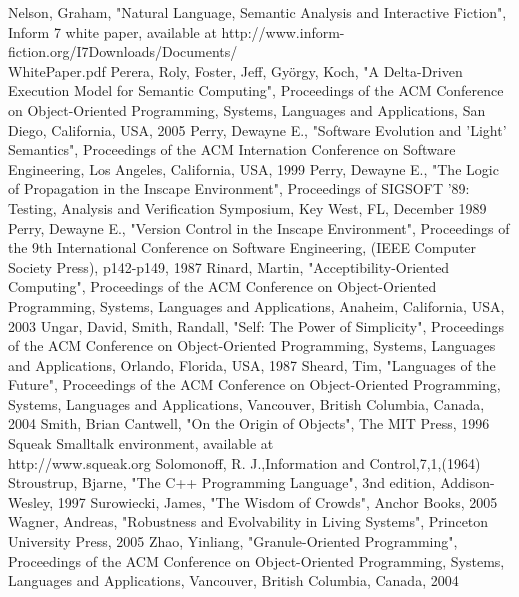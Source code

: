 \documentclass[10pt]{sigplanconf}
\begin{document}
\begin{thebibliography}{}
Nelson, Graham, "Natural Language, Semantic Analysis and Interactive Fiction", Inform 7 white paper, available at http://www.inform-fiction.org/I7Downloads/Documents/ \\
WhitePaper.pdf
Perera, Roly, Foster, Jeff, Gy\"orgy, Koch, "A Delta-Driven Execution Model for Semantic Computing", Proceedings of the ACM Conference on Object-Oriented Programming, Systems, Languages and Applications, San Diego, California, USA, 2005
Perry, Dewayne E., "Software Evolution and 'Light' Semantics", Proceedings of the ACM Internation Conference on Software Engineering, Los Angeles,  California, USA, 1999
Perry, Dewayne E., "The Logic of Propagation in the Inscape Environment", Proceedings of SIGSOFT '89: Testing, Analysis and Verification Symposium, Key West, FL, December 1989
Perry, Dewayne E., "Version Control in the Inscape Environment", Proceedings of the 9th International Conference on Software Engineering,
(IEEE Computer Society Press), p142-p149, 1987
Rinard, Martin, "Acceptibility-Oriented Computing", Proceedings of the ACM Conference on Object-Oriented Programming, Systems, Languages and Applications, Anaheim, California, USA, 2003
Ungar, David, Smith, Randall, "Self: The Power of Simplicity", Proceedings of the ACM Conference on Object-Oriented Programming, Systems, Languages and Applications,  Orlando, Florida, USA, 1987
Sheard,  Tim, "Languages of the Future", Proceedings of the ACM Conference on Object-Oriented Programming, Systems, Languages and Applications,  Vancouver, British Columbia, Canada, 2004
Smith, Brian Cantwell, "On the Origin of Objects", The MIT Press, 1996
Squeak Smalltalk environment, available at \\
http://www.squeak.org
Solomonoff, R. J.,Information and Control,7,1,(1964)
Stroustrup, Bjarne, "The C++ Programming Language", 3nd edition, Addison-Wesley, 1997
Surowiecki, James, "The Wisdom of Crowds", Anchor Books, 2005
Wagner, Andreas, "Robustness and Evolvability in Living Systems", Princeton University Press, 2005
Zhao, Yinliang, "Granule-Oriented Programming", Proceedings of the ACM Conference on Object-Oriented Programming, Systems, Languages and Applications,  Vancouver, British Columbia, Canada, 2004
\end{thebibliography}
\end{document}

